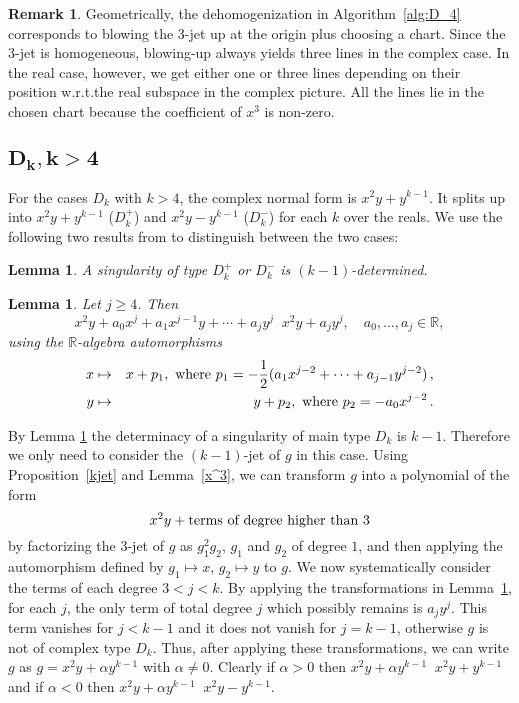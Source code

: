 \documentclass[noend]{amsproc}
\newtheorem{lemma}[theorem]{Lemma}
\theoremstyle{definition}
\newtheorem{remark}[theorem]{Remark}
\DeclareMathOperator{\requiv}{\overset{r}{\sim}}
\begin{document}
\begin{remark}
Geometrically, the dehomogenization in Algorithm~\ref{alg:D_4} corresponds to
blowing the 3-jet up at the origin plus choosing a chart. Since the 3-jet is
homogeneous, blowing-up always yields three lines in the complex case. In the
real case, however, we get either one or three lines depending on their
position w.r.t.\@ the real subspace in the complex picture. All the lines lie
in the chosen chart because the coefficient of $x^3$ is non-zero.
\end{remark}


\subsection{$\boldsymbol{D_k, k > 4}$}

For the cases $D_k$ with $k > 4$, the complex normal form is $x^2y+y^{k-1}$. It
splits up into $x^2y+y^{k-1}$ ($D_k^+$) and $x^2y-y^{k-1}$ ($D_k^-$) for each
$k$ over the reals. We use the following two results from \cite{Siersma} to
distinguish between the two cases:

\begin{lemma}\label{kDeterminacyD[k]k>4}
A singularity of type $D_k^+$ or $D_k^-$ is $(k-1)$-determined.
\end{lemma}

\begin{lemma}\label{transformationD[k]}
Let $j\ge 4$. Then
\[
x^2y+a_0x^j+a_1x^{j-1}y+\cdots+a_jy^j\requiv x^2y+a_j y^j,
\quad a_0,\ldots,a_j\in\mathbb R,
\]
using the $\mathbb R$-algebra automorphisms
\begin{eqnarray*}
x&\mapsto&x+p_1,\textnormal{ where }
p_1=-\frac{1}{2}(a_1x^{j-2}+\cdots+a_{j-1}y^{j-2})\,,\\
y&\mapsto&y+p_2,\textnormal{ where } p_2=-a_0x^{j-2} \,.
\end{eqnarray*}
\end{lemma}

By Lemma \ref{kDeterminacyD[k]k>4} the determinacy of a singularity of main
type $D_k$ is $k-1$. Therefore we only need to consider the $(k-1)$-jet of $g$
in this case. Using Proposition~\ref{kjet} and Lemma~\ref{x^3}, we can
transform $g$ into a polynomial of the form \[x^2y+\textnormal{terms of degree
higher than $3$}\] by factorizing the $3$-jet of $g$ as $g_1^2g_2$, $g_1$ and
$g_2$ of degree $1$, and then applying the automorphism defined by
$g_1\mapsto x$, $g_2\mapsto y$ to $g$. We now systematically consider the terms
of each degree $3<j<k$. By applying the transformations in
Lemma~\ref{transformationD[k]}, for each $j$, the only term of total degree $j$
which possibly remains is $a_jy^j$. This term vanishes for $j<k-1$ and it does
not vanish for $j=k-1$, otherwise $g$ is not of complex type $D_k$. Thus, after
applying these transformations, we can write $g$ as $g=x^2y+\alpha y^{k-1}$
with $\alpha \neq 0$. Clearly if $\alpha>0$ then
$x^2y+\alpha y^{k-1}\requiv x^2y+y^{k-1}$ and if
$\alpha<0$ then $x^2y+\alpha y^{k-1}\requiv x^2y-y^{k-1}$.
\end{document}
